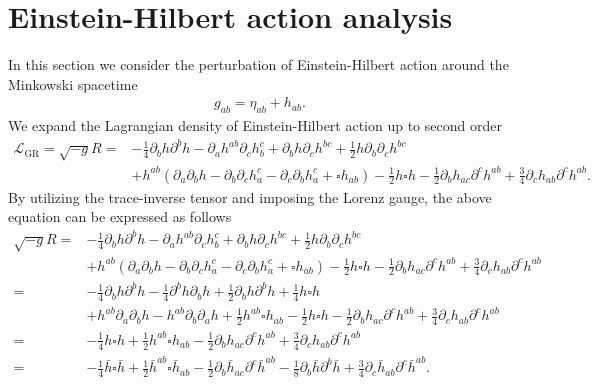 \documentclass[prd,aps,a4paper,superscriptaddress,onecolumn,nofootinbib]{revtex4}
\begin{document}
\section{Einstein-Hilbert action analysis}
\label{sec3}
In this section we consider the perturbation of Einstein-Hilbert action around the Minkowski spacetime
\begin{align}
g_{ab}=\eta_{ab}+h_{ab}.
\end{align}
We expand the Lagrangian density of Einstein-Hilbert action up to second order
\begin{equation}
\begin{aligned}
\mathcal{L}_{\mathrm{GR}} = \sqrt{-g}R = & -\frac{1}{4}\partial_b h \partial^b h - \partial_a h^{ab}\partial_c h^c_b + \partial_b h\partial_c h^{bc} + \frac{1}{2} h\partial_b\partial_c h^{bc} \\
& + h^{ab}(\partial_a\partial_b h-\partial_b\partial_c h^c_a - \partial_c\partial_b h^c_a + \square h_{ab}) - \frac{1}{2} h \square h - \frac{1}{2}\partial_b h_{ac}\partial^c h^{ab} + \frac{3}{4}\partial_c h_{ab}\partial^c h^{ab}.
\end{aligned}
\end{equation}
By utilizing the trace-inverse tensor and imposing the Lorenz gauge, the above equation can be expressed as follows
\begin{equation}
\begin{aligned}
\sqrt{-g}R = & -\frac{1}{4}\partial_b h \partial^b h - \partial_a h^{ab}\partial_c h^c_b + \partial_b h\partial_c h^{bc} + \frac{1}{2}h\partial_b\partial_c h^{bc} \\
& + h^{ab}(\partial_a\partial_b h-\partial_b\partial_c h^c_a - \partial_c\partial_b h^c_a + \square h_{ab}) - \frac{1}{2}h \square h - \frac{1}{2}\partial_b h_{ac}\partial^c h^{ab} + \frac{3}{4}\partial_c h_{ab}\partial^c h^{ab} \\
= & -\frac{1}{4}\partial_bh\partial^b h - \frac{1}{4}\partial^bh\partial_bh + \frac{1}{2}\partial_bh\partial^bh + \frac{1}{4} h\square h \\
& + h^{ab}\partial_a\partial_b h - h^{ab}\partial_b\partial_a h + \frac{1}{2} h^{ab}\square h_{ab} - \frac{1}{2} h\square h - \frac{1}{2} \partial_b h_{ac}\partial^c h^{ab} + \frac{3}{4}\partial_c h_{ab}\partial^c h^{ab}\\
= & -\frac{1}{4} h\square h + \frac{1}{2} h^{ab}\square h_{ab} - \frac{1}{2} \partial_b h_{ac}\partial^c h^{ab} + \frac{3}{4}\partial_c h_{ab}\partial^c h^{ab} \\
= & -\frac{1}{4} \bar{h}\square \bar{h} + \frac{1}{2}\bar{h}^{ab}\square \bar{h}_{ab} - \frac{1}{2}\partial_b \bar{h}_{ac}\partial^c \bar{h}^{ab} - \frac{1}{8}\partial_b\bar{h} \partial^b\bar{h} + \frac{3}{4}\partial_c \bar{h}_{ab}\partial^c \bar{h}^{ab}.
\end{aligned}
\end{equation}
\end{document}
